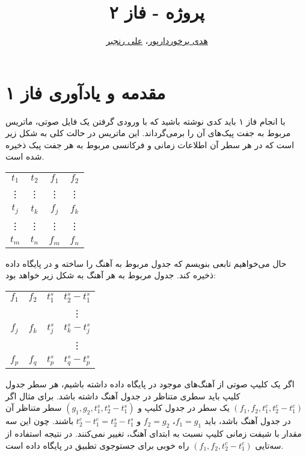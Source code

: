 \documentclass{utsignal}
\title{پروژه - فاز ۲}
\author{\href{mailto:h.barkhordarpour@ut.ac.ir?subject=[SS\%20S98 A2]}{هدی برخوردارپور}، 
\href{mailto:ranjbar.ali@ut.ac.ir?subject=[SS\%20S98 A2]\%20}{علی رنجبر}}
\begin{document}
	\maketitle
	\section*{مقدمه و یادآوری فاز ۱}
	با انجام فاز ۱ باید کدی نوشته باشید که با ورودی گرفتن یک فایل صوتی، ماتریس مربوط به جفت پیک‌های آن را برمی‌گرداند. این ماتریس در حالت کلی به شکل زیر است که در هر سطر آن اطلاعات زمانی و فرکانسی مربوط به هر جفت پیک ذخیره شده است.
	\begin{center}
		\begin{latin}
			\begin{tabular}{|c|c|c|c|}
				$t_1$ & $t_2$ & $f_1$ & $f_2$ \\
				\vdots&\vdots&\vdots&\vdots\\
				$t_j$ & $t_k$ & $f_j$ & $f_k$ \\
				\vdots&\vdots&\vdots&\vdots\\
				$t_m$ & $t_n$ & $f_m$ & $f_n$ \\
			\end{tabular}
		\end{latin}
	\end{center}
	حال می‌خواهیم تابعی بنویسم که جدول مربوط به آهنگ را ساخته و در پایگاه داده ذخیره کند. جدول مربوط به هر آهنگ به شکل زیر خواهد بود:
	\begin{center}
		\begin{latin}
			\begin{tabular}{|c|c|c|c|}
				$f_1$ & $f_2$ & $t_1^s$ & $t_2^s-t_1^s$\\
				&&&\vdots\\
				$f_j$ & $f_k$ & $t_j^s$ & $t_k^s-t_j^s$\\
				&&&\vdots\\
				$f_p$ & $f_q$ & $t_p^s$ & $t_q^s-t_p^s$\\
			\end{tabular}
		\end{latin}
	\end{center}
	اگر یک کلیپ صوتی از آهنگ‌های موجود در پایگاه داده داشته باشیم، هر سطر جدول کلیپ باید سطری متناظر در جدول آهنگ داشته باشد. برای مثال اگر $(f_1, f_2, t_1^c, t_2^c-t_1^c)$ یک سطر در جدول کلیپ و $(g_1, g_2, t_1^s, t_2^s-t_1^s)$ سطر متناظر آن در جدول آهنگ باشد، باید $f_1=g_1$، $f_2=g_2$ و $t_2^c-t_1^c=t_2^s-t_1^s$ باشند. چون این سه مقدار با شیفت زمانی کلیپ نسبت به ابتدای آهنگ، تغییر نمی‌کنند. در نتیجه استفاده از سه‌تایی $(f_1, f_2, t_2^c-t_1^c)$ راه خوبی برای جستوجوی تطبیق در پایگاه داده است.
	
\end{document}
